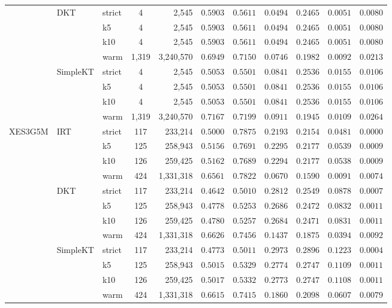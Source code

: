 \begin{table}[tbp]
{\begin{tabular}{lllcrcccccc}
 & DKT & strict & 4 & 2,545 & $0.5903$ & $0.5611$ & $0.0494$ & $0.2465$ & $0.0051$ & $0.0080$ \\
 &  & k5 & 4 & 2,545 & $0.5903$ & $0.5611$ & $0.0494$ & $0.2465$ & $0.0051$ & $0.0080$ \\
 &  & k10 & 4 & 2,545 & $0.5903$ & $0.5611$ & $0.0494$ & $0.2465$ & $0.0051$ & $0.0080$ \\
 &  & warm & 1,319 & 3,240,570 & $0.6949$ & $0.7150$ & $0.0746$ & $0.1982$ & $0.0092$ & $0.0213$ \\
 & SimpleKT & strict & 4 & 2,545 & $0.5053$ & $0.5501$ & $0.0841$ & $0.2536$ & $0.0155$ & $0.0106$ \\
 &  & k5 & 4 & 2,545 & $0.5053$ & $0.5501$ & $0.0841$ & $0.2536$ & $0.0155$ & $0.0106$ \\
 &  & k10 & 4 & 2,545 & $0.5053$ & $0.5501$ & $0.0841$ & $0.2536$ & $0.0155$ & $0.0106$ \\
 &  & warm & 1,319 & 3,240,570 & $0.7167$ & $0.7199$ & $0.0911$ & $0.1945$ & $0.0109$ & $0.0264$ \\
\midrule
XES3G5M & IRT & strict & 117 & 233,214 & $0.5000$ & $0.7875$ & $0.2193$ & $0.2154$ & $0.0481$ & $0.0000$ \\
 &  & k5 & 125 & 258,943 & $0.5156$ & $0.7691$ & $0.2295$ & $0.2177$ & $0.0539$ & $0.0009$ \\
 &  & k10 & 126 & 259,425 & $0.5162$ & $0.7689$ & $0.2294$ & $0.2177$ & $0.0538$ & $0.0009$ \\
 &  & warm & 424 & 1,331,318 & $0.6561$ & $0.7822$ & $0.0670$ & $0.1590$ & $0.0091$ & $0.0074$ \\
 & DKT & strict & 117 & 233,214 & $0.4642$ & $0.5010$ & $0.2812$ & $0.2549$ & $0.0878$ & $0.0007$ \\
 &  & k5 & 125 & 258,943 & $0.4778$ & $0.5253$ & $0.2686$ & $0.2472$ & $0.0832$ & $0.0011$ \\
 &  & k10 & 126 & 259,425 & $0.4780$ & $0.5257$ & $0.2684$ & $0.2471$ & $0.0831$ & $0.0011$ \\
 &  & warm & 424 & 1,331,318 & $0.6626$ & $0.7456$ & $0.1437$ & $0.1875$ & $0.0394$ & $0.0092$ \\
 & SimpleKT & strict & 117 & 233,214 & $0.4773$ & $0.5011$ & $0.2973$ & $0.2896$ & $0.1223$ & $0.0004$ \\
 &  & k5 & 125 & 258,943 & $0.5015$ & $0.5329$ & $0.2774$ & $0.2747$ & $0.1109$ & $0.0011$ \\
 &  & k10 & 126 & 259,425 & $0.5017$ & $0.5332$ & $0.2773$ & $0.2747$ & $0.1108$ & $0.0011$ \\
 &  & warm & 424 & 1,331,318 & $0.6615$ & $0.7415$ & $0.1860$ & $0.2098$ & $0.0607$ & $0.0079$ \\
\bottomrule


\end{tabular}}
\end{table}
